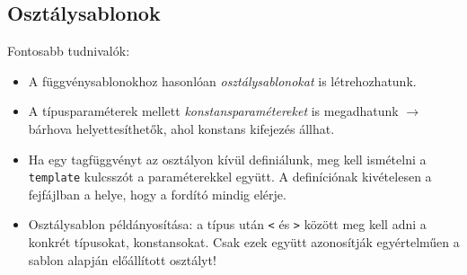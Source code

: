 \documentclass[usenames,dvipsnames,aspectratio=169]{beamer}
\begin{document}
\subsection{Osztálysablonok}

\begin{frame}
    Fontosabb tudnivalók:
    \begin{itemize}
        \item A függvénysablonokhoz hasonlóan \emph{osztálysablonokat} is létrehozhatunk.
        \item A típusparaméterek mellett \emph{konstansparamétereket} is megadhatunk $\to$ bárhova helyettesíthetők, ahol konstans kifejezés állhat.
        \item Ha egy tagfüggvényt az osztályon kívül definiálunk, meg kell ismételni a \texttt{template} kulcsszót a paraméterekkel együtt. A definíciónak kivételesen a fejfájlban a helye, hogy a fordító mindig elérje.
        \item Osztálysablon példányosítása: a típus után \texttt{<} és \texttt{>} között meg kell adni a konkrét típusokat, konstansokat. Csak ezek együtt azonosítják egyértelműen a sablon alapján előállított osztályt!
    \end{itemize}
\end{frame}

\begin{frame}
    \begin{exampleblock}{}
        
    \end{exampleblock}
\end{frame}

\begin{frame}
    \begin{exampleblock}{}
        \small
        
    \end{exampleblock}
\end{frame}

\begin{frame}
    \begin{exampleblock}{}
        
    \end{exampleblock}
\end{frame}

\begin{frame}
    \begin{exampleblock}{}
        
    \end{exampleblock}
\end{frame}

\begin{frame}
    \begin{exampleblock}{}
        
    \end{exampleblock}
\end{frame}
\end{document}
